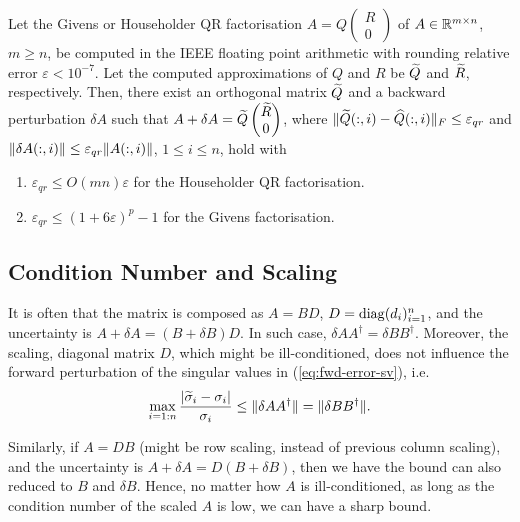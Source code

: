 \documentclass{article}
\begin{document}
\begin{proposition}\label{prop:qr-errbd}
  Let the Givens or Householder QR factorisation 
  $
  A = Q
  \begin{pmatrix}
    R \\ 0
  \end{pmatrix}
  $
  of $A\in\mathbb{R}^{m\times n}$, $m\ge n$, be computed in the IEEE floating point
  arithmetic with rounding relative error $\varepsilon < 10^{-7}$. Let the
  computed approximations of $Q$ and $R$ be $\widetilde Q$ and $\widetilde R$,
  respectively. Then, there exist an orthogonal matrix $\widetilde Q$ and a
  backward perturbation $\delta A$ such that $A + \delta A = \widetilde Q
  \begin{pmatrix}
    \widetilde R \\ 0
  \end{pmatrix}
  $, where $\|{\widetilde Q(:,i) - \widehat Q(:,i)}\|_F \le \varepsilon_{qr}$ and 
  $\|{\delta A(:,i)}\| \leq \varepsilon_{qr}\|{A(:,i)}\|$, $1\le i\le n$, 
  hold with  
  \begin{enumerate}
\item
  $\varepsilon_{qr}\le O(mn)\varepsilon$ for the Householder QR
  factorisation.  
\item 
  $\varepsilon_{qr}\le (1+6\varepsilon)^p - 1$ for the Givens
  factorisation. 
  \end{enumerate}
\end{proposition}

\subsection{Condition Number and Scaling}\label{sec:cond-numb-scal}

It is often that the matrix is composed as $A = BD$, $D =
\operatorname{diag}(d_i)_{i=1}^n$, and the uncertainty is $A + \delta A = (B + \delta
B)D$. In such case, $\delta A A ^{\dagger} = \delta BB^{\dagger}$.
Moreover, the scaling, diagonal matrix $D$, which might be ill-conditioned,
does not influence the forward perturbation of the singular values in
(\ref{eq:fwd-error-sv}), i.e. 
\begin{equation}\notag
  \max_{i=1:n}\frac{|\widetilde \sigma_i-\sigma_i|}{\sigma_i} \leq 
\|{\delta A A^{\dagger}}\| = \|{\delta BB^{\dagger}}\|.
\end{equation}

Similarly, if $A = DB$ (might be row scaling, instead of previous column
scaling), and the uncertainty is $A + \delta A = D(B + \delta B)$, then we
have the bound can also reduced to $B$ and $\delta B$. Hence, no matter how
$A$ is ill-conditioned, as long as the condition number of the scaled $A$
is low, we can have a sharp bound.
\end{document}
